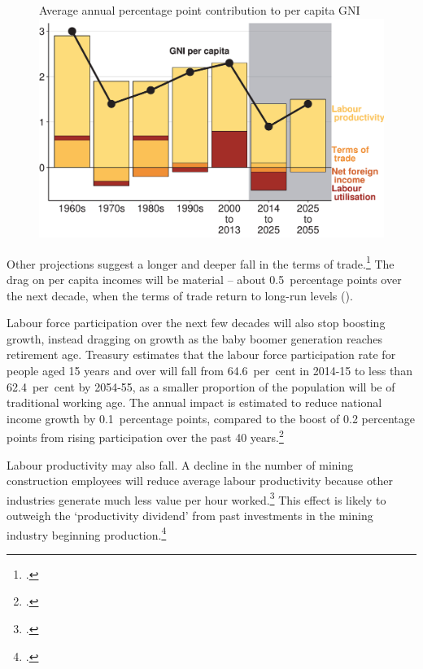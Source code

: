 \documentclass[twoside,english]{Dianab5ona4portrait}
\begin{document}
\begin{figure}[!t]
%
{Average annual percentage point contribution to per capita GNI}
\includegraphics[width=\columnwidth]{Fiscal-challenges/figure/Figure5-1.pdf}

\end{figure} 

Other projections suggest a longer and deeper fall in the terms of trade.\footcite{Treasury2014-Budget-Papers-2014-15}  The drag on per capita incomes will be material – about 0.5~percentage points over the next decade, when the terms of trade return to long-run levels ().

Labour force participation over the next few decades will also stop boosting growth, instead dragging on growth as the baby boomer generation reaches retirement age. Treasury estimates that the labour force participation rate for people aged 15 years and over will fall from 64.6~per~cent in 2014-15 to less than 62.4~per~cent by 2054-55, as a smaller proportion of the population will be of traditional working age.  The annual impact is estimated to reduce national income growth by 0.1~percentage points, compared to the boost of 0.2 percentage points from rising participation over the past 40 years.\footcite[][pp.~ix,xi]{Hockey2015IGR}  

Labour productivity may also fall. A decline in the number of mining construction employees will reduce average labour productivity because other industries generate much less value per hour worked.\footcite{Borland2014}  This effect is likely to outweigh the ‘productivity dividend’ from past investments in the mining industry beginning production.\footcite[][12]{Commission2014} 
\end{document}
